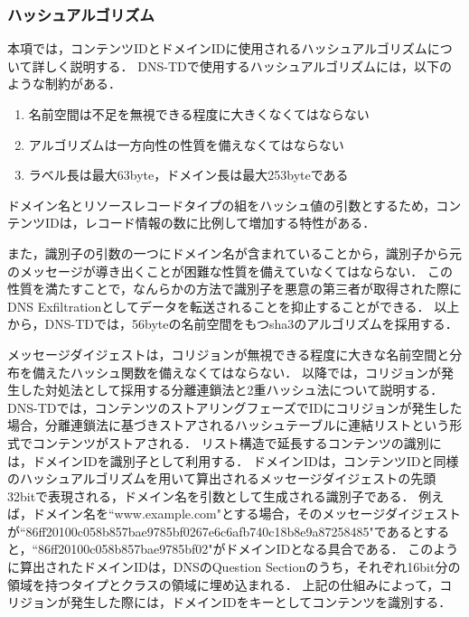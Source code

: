 \subsubsection{ハッシュアルゴリズム}
本項では，コンテンツIDとドメインIDに使用されるハッシュアルゴリズムについて詳しく説明する．
DNS-TDで使用するハッシュアルゴリズムには，以下のような制約がある．

\begin{enumerate}
 \item 名前空間は不足を無視できる程度に大きくなくてはならない
 \vspace{-3mm}
 \item アルゴリズムは一方向性の性質を備えなくてはならない
 \vspace{-3mm}
 \item ラベル長は最大63byte，ドメイン長は最大253byteである
 \vspace{-3mm}
\end{enumerate}

ドメイン名とリソースレコードタイプの組をハッシュ値の引数とするため，コンテンツIDは，レコード情報の数に比例して増加する特性がある．

また，識別子の引数の一つにドメイン名が含まれていることから，識別子から元のメッセージが導き出くことが困難な性質を備えていなくてはならない．
この性質を満たすことで，なんらかの方法で識別子を悪意の第三者が取得された際にDNS Exfiltrationとしてデータを転送されることを抑止することができる．
以上から，DNS-TDでは，56byteの名前空間をもつsha3のアルゴリズムを採用する．

メッセージダイジェストは，コリジョンが無視できる程度に大きな名前空間と分布を備えたハッシュ関数を備えなくてはならない．
以降では，コリジョンが発生した対処法として採用する分離連鎖法と2重ハッシュ法について説明する．
DNS-TDでは，コンテンツのストアリングフェーズでIDにコリジョンが発生した場合，分離連鎖法に基づきストアされるハッシュテーブルに連結リストという形式でコンテンツがストアされる．
リスト構造で延長するコンテンツの識別には，ドメインIDを識別子として利用する．
ドメインIDは，コンテンツIDと同様のハッシュアルゴリズムを用いて算出されるメッセージダイジェストの先頭32bitで表現される，ドメイン名を引数として生成される識別子である．
例えば，ドメイン名を``www.example.com"とする場合，そのメッセージダイジェストが``86ff20100c058b857bae9785bf0267e6c6afb740c18b8e9a87258485"であるとすると，``86ff20100c058b857bae9785bf02"がドメインIDとなる具合である．
このように算出されたドメインIDは，DNSのQuestion Sectionのうち，それぞれ16bit分の領域を持つタイプとクラスの領域に埋め込まれる．
上記の仕組みによって，コリジョンが発生した際には，ドメインIDをキーとしてコンテンツを識別する．

